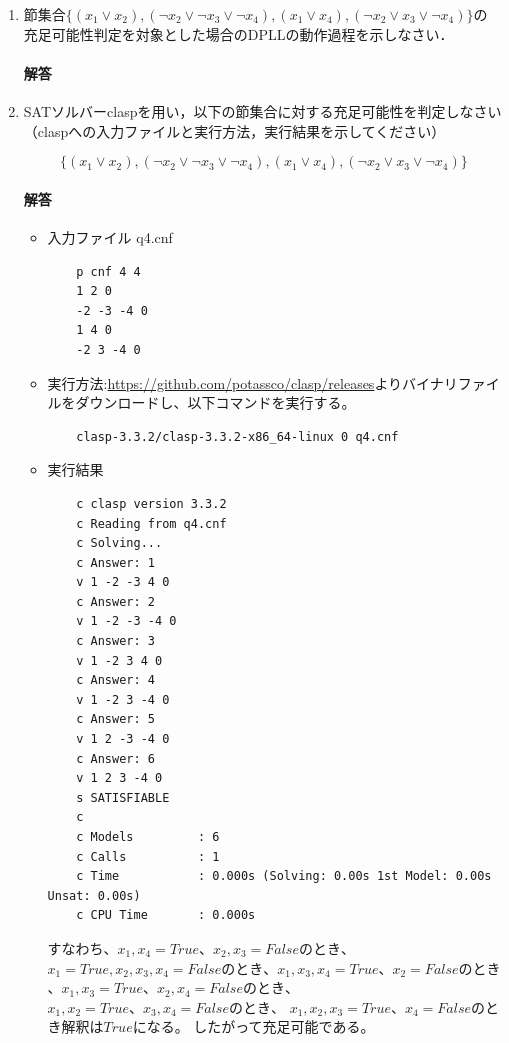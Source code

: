 \documentclass[dvipdfmx]{jsarticle}
\begin{document}
\begin{enumerate}
\item 節集合$\{(x_1\lor x_2), (\neg x_2 \lor \neg x_3\lor  \neg x_4), (x_1\lor x_4), (\neg x_2\lor x_3\lor \neg x_4)\}$の
  充足可能性判定を対象とした場合のDPLLの動作過程を示しなさい．
\paragraph{解答}




\item SATソルバーclaspを用い，以下の節集合に対する充足可能性を判定しなさい
（claspへの入力ファイルと実行方法，実行結果を示してください）

\[
\{(x_1\lor x_2), (\neg x_2 \lor \neg x_3\lor  \neg x_4), (x_1\lor x_4), (\neg x_2\lor x_3\lor \neg x_4)\}
\]
\paragraph{解答}\par
\begin{itemize}
  \item 入力ファイル q4.cnf
  \begin{verbatim}
    p cnf 4 4
    1 2 0
    -2 -3 -4 0
    1 4 0
    -2 3 -4 0
  \end{verbatim}
  \item 実行方法:\url{https://github.com/potassco/clasp/releases}よりバイナリファイルをダウンロードし、以下コマンドを実行する。
  \begin{verbatim}
    clasp-3.3.2/clasp-3.3.2-x86_64-linux 0 q4.cnf
  \end{verbatim}
  \item 実行結果
  \begin{verbatim}
    c clasp version 3.3.2
    c Reading from q4.cnf
    c Solving...
    c Answer: 1
    v 1 -2 -3 4 0
    c Answer: 2
    v 1 -2 -3 -4 0
    c Answer: 3
    v 1 -2 3 4 0
    c Answer: 4
    v 1 -2 3 -4 0
    c Answer: 5
    v 1 2 -3 -4 0
    c Answer: 6
    v 1 2 3 -4 0
    s SATISFIABLE
    c
    c Models         : 6
    c Calls          : 1
    c Time           : 0.000s (Solving: 0.00s 1st Model: 0.00s Unsat: 0.00s)
    c CPU Time       : 0.000s
  \end{verbatim}
  すなわち、$x_{1}, x_{4} = True、x_{2}, x_{3}=Falseのとき$、$x_{1} = True, x_{2}, x_{3}, x_{4} = Falseのとき$、$x_{1}, x_{3}, x_{4} = True、x_{2} = Falseのとき$、$x_{1}, x_{3} = True、x_{2}, x_{4} = Falseのとき$、$x_{1}, x_{2} = True、x_{3}, x_{4} = Falseのとき$、
  $x_{1}, x_{2}, x_{3} = True、x_{4} = False$のとき解釈は$True$になる。
  したがって充足可能である。
\end{itemize}



\end{enumerate}
\end{document}
